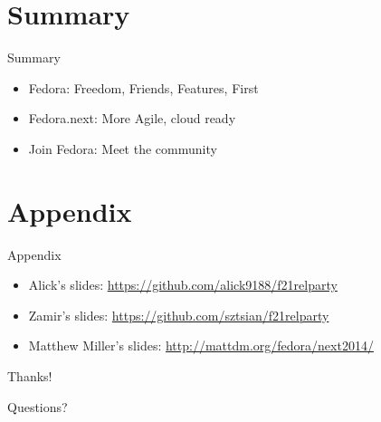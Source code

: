 \documentclass{beamer}
\begin{document}
\section*{Summary}

\begin{frame}{Summary}
  \begin{itemize}
  \item Fedora: Freedom, Friends, Features, First
  \item Fedora.next: More Agile, cloud ready
  \item Join Fedora: Meet the community
  \end{itemize}
\end{frame}

\section*{Appendix}

\begin{frame}{Appendix}
  \begin{itemize}
    \item Alick's slides: \url{https://github.com/alick9188/f21relparty}
    \item Zamir's slides: \url{https://github.com/sztsian/f21relparty}
    \item Matthew Miller's slides: \url{http://mattdm.org/fedora/next2014/}
  \end{itemize}
\end{frame}

\begin{frame}
  \begin{center}
    {\LARGE Thanks!
    \bigskip

    Questions?}

  \end{center}
\end{frame}
\end{document}

